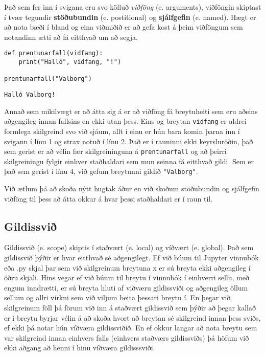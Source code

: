 Það sem fer inn í svigana eru svo kölluð \emph{viðföng} (e. arguments), viðföngin skiptast í tvær tegundir \textbf{stöðubundin} (e. postitional) og \textbf{sjálfgefin} (e. named).
Hægt er að nota bæði í bland og eina viðmiðið er að gefa kost á þeim viðföngum sem notandinn ætti að fá eitthvað um að segja.

\begin{lstlisting}[caption=Föll með viðföngum, label=lst:foll-vidfong]
def prentunarfall(vidfang):
	print("Halló", vidfang, "!")
	
prentunarfall("Valborg")
\end{lstlisting}
\lstset{style=uttak}
\begin{lstlisting}
Halló Valborg!
\end{lstlisting}
\lstset{style=venjulegt}

Annað sem mikilvægt er að átta sig á er að viðföng fá breytuheiti sem eru aðeins aðgengileg innan fallsins en ekki utan þess.
Eins og breytan \texttt{vidfang} er aldrei formlega skilgreind svo við sjáum, allt í einu er hún bara komin þarna inn í svigann í línu 1 og strax notuð í línu 2.
Það er í rauninni ekki keyrsluröðin, það sem gerist er að vélin fær skilgreininguna á \texttt{prentunarfall} og að þeirri skilgreiningu fylgir einhver staðhaldari sem mun seinna fá eitthvað gildi.
Sem er það sem gerist í línu 4, við gefum breytunni gildið \texttt{"Valborg"}.

Við ætlum þá að skoða nýtt hugtak áður en við skoðum stöðubundin og sjálfgefin viðföng til þess að átta okkur á hvar þessi staðhaldari er í raun til.

\subsection{Gildissvið}\label{uk:gildissvið}
Gildissvið (e. scope) skiptis í staðvært (e. local) og víðvært (e. global). 
Það sem gildissvið þýðir er hvar eitthvað sé aðgengilegt.
Ef við búum til Jupyter vinnubók eða .py skjal þar sem við skilgreinum breytuna x er sú breyta ekki aðgengileg í öðru skjali.
Hins vegar ef við búum til breytu í vinnubók í einhverri sellu, með engum inndrætti, er sú breyta hluti af viðværu gildissviði og aðgengileg öllum sellum og allri virkni sem við viljum beita þessari breytu í.
En þegar við skilgreinum föll þá förum við inn á staðvært gildissvið sem þýðir að þegar kallað er í breytu byrjar vélin á að skoða hvort að breytan sé skilgreind innan þess sviðs, ef ekki þá notar hún víðværa gildissviðið.
En ef okkur langar að nota breytu sem var skilgreind innan einhvers falls (einhvers staðværs gildissviðs) þá höfum við ekki aðgang að henni í hinu víðværa gildisssviði.

